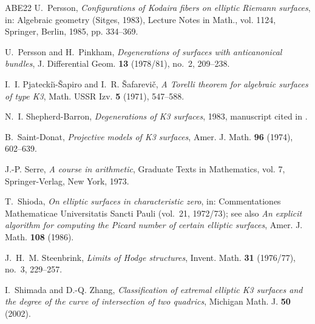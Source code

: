 \documentclass[11pt]{amsart}
\theoremstyle{plain}
\theoremstyle{definition}
\begin{document}
\begin{thebibliography}{ABE22}
 U.~Persson,
\emph{Configurations of {K}odaira fibers on elliptic {R}iemann surfaces},
in: Algebraic geometry (Sitges, 1983), Lecture Notes in Math., vol. 1124,
Springer, Berlin, 1985, pp. 334--369.

 U.~Persson and H.~Pinkham,
\emph{Degenerations of surfaces with anticanonical bundles},
J. Differential Geom. \textbf{13} (1978/81), no.~2, 209--238.

 I.~I. Pjatecki{\u\i}-\v{S}apiro and I.~R. \v{S}afarevi\v{c},
\emph{A {T}orelli theorem for algebraic surfaces of type {K3}},
Math. USSR Izv. \textbf{5} (1971), 547--588.

 N.~I. Shepherd-Barron,
\emph{Degenerations of {K3} surfaces}, 1983, manuscript cited in
\cite{DPT24}.

 B.~Saint-Donat,
\emph{Projective models of {K3} surfaces},
Amer. J. Math. \textbf{96} (1974), 602--639.

 J.-P. Serre, \emph{A course in arithmetic},
Graduate Texts in Mathematics, vol. 7, Springer-Verlag, New York, 1973.

 T.~Shioda,
\emph{On elliptic surfaces in characteristic zero},
in: Commentationes Mathematicae Universitatis Sancti Pauli
(vol.~21, 1972/73); see also \emph{An explicit algorithm for computing the
Picard number of certain elliptic surfaces}, Amer. J. Math. \textbf{108} (1986).

 J.~H.~M. Steenbrink,
\emph{Limits of {H}odge structures},
Invent. Math. \textbf{31} (1976/77), no.~3, 229--257.

 I.~Shimada and D.-Q. Zhang,
\emph{Classification of extremal elliptic {K3} surfaces and the degree of the
curve of intersection of two quadrics}, Michigan Math. J. \textbf{50} (2002).

\end{thebibliography}
\end{document}

